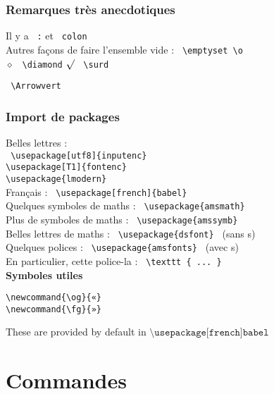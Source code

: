 \documentclass{report}
\begin{document}
\subsubsection*{Remarques très anecdotiques}

Il y a  \texttt{ :} et \texttt{ colon} \\
Autres façons de faire l'ensemble vide : \texttt{ \textbackslash{}emptyset \textbackslash{}o } \\
$ \diamond $ \quad \texttt{ \textbackslash{}diamond} $ \surd $   \texttt{ \textbackslash{}surd}

\texttt{ \textbackslash{}Arrowvert}


\subsubsection*{Import de packages}

Belles lettres : \\
\texttt{
\textbackslash{}usepackage[utf8]\{inputenc\} \\
\textbackslash{}usepackage[T1]\{fontenc\} \\
\textbackslash{}usepackage\{lmodern\}
} \\
Français : \texttt{ \textbackslash{}usepackage[french]\{babel\} } \\
Quelques symboles de maths : \texttt{ \textbackslash{}usepackage\{amsmath\} } \\
Plus de symboles de maths : \texttt{ \textbackslash{}usepackage\{amssymb\} } \\
Belles lettres de maths : \texttt{ \textbackslash{}usepackage\{dsfont\} } (sans s) \\
Quelques polices : \texttt{ \textbackslash{}usepackage\{amsfonts\} } (avec s)\\
En particulier, cette police-la : \texttt{ \textbackslash texttt \{ ... \}}\\

\textbf{Symboles utiles}

\begin{verbatim}
\newcommand{\og}{«}
\newcommand{\fg}{»}
\end{verbatim}

These are provided by default in $\texttt{\textbackslash usepackage[french]{babel}}$

\newpage

\section*{Commandes}
\end{document}
